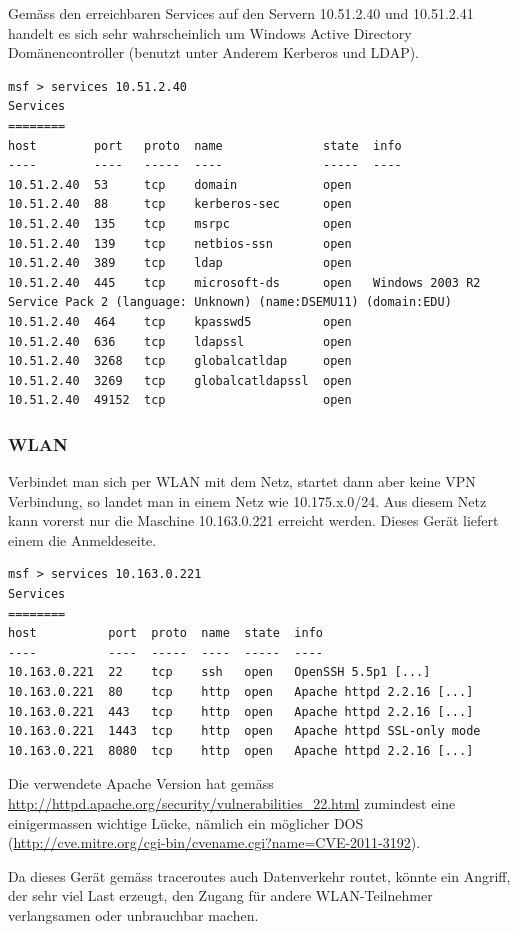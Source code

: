 \documentclass[a4paper,11pt]{scrartcl}
\begin{document}
Gemäss den erreichbaren Services auf den Servern 10.51.2.40 und 10.51.2.41 handelt es sich sehr wahrscheinlich um Windows Active Directory Domänencontroller (benutzt unter Anderem Kerberos und LDAP).
\begin{lstlisting}
msf > services 10.51.2.40
Services
========
host        port   proto  name              state  info
----        ----   -----  ----              -----  ----
10.51.2.40  53     tcp    domain            open   
10.51.2.40  88     tcp    kerberos-sec      open   
10.51.2.40  135    tcp    msrpc             open   
10.51.2.40  139    tcp    netbios-ssn       open   
10.51.2.40  389    tcp    ldap              open   
10.51.2.40  445    tcp    microsoft-ds      open   Windows 2003 R2 Service Pack 2 (language: Unknown) (name:DSEMU11) (domain:EDU)
10.51.2.40  464    tcp    kpasswd5          open   
10.51.2.40  636    tcp    ldapssl           open   
10.51.2.40  3268   tcp    globalcatldap     open   
10.51.2.40  3269   tcp    globalcatldapssl  open   
10.51.2.40  49152  tcp                      open   
\end{lstlisting}

\subsubsection{WLAN}
Verbindet man sich per WLAN mit dem Netz, startet dann aber keine VPN Verbindung, so landet man in einem Netz wie 10.175.x.0/24. Aus diesem Netz kann vorerst nur die Maschine 10.163.0.221 erreicht werden. Dieses Gerät liefert einem die Anmeldeseite.
\begin{lstlisting}
msf > services 10.163.0.221
Services
========
host          port  proto  name  state  info
----          ----  -----  ----  -----  ----
10.163.0.221  22    tcp    ssh   open   OpenSSH 5.5p1 [...]
10.163.0.221  80    tcp    http  open   Apache httpd 2.2.16 [...]
10.163.0.221  443   tcp    http  open   Apache httpd 2.2.16 [...]
10.163.0.221  1443  tcp    http  open   Apache httpd SSL-only mode 
10.163.0.221  8080  tcp    http  open   Apache httpd 2.2.16 [...]
\end{lstlisting}
Die verwendete Apache Version hat gemäss \url{http://httpd.apache.org/security/vulnerabilities_22.html} zumindest eine einigermassen wichtige Lücke, nämlich ein möglicher DOS (\url{http://cve.mitre.org/cgi-bin/cvename.cgi?name=CVE-2011-3192}).

Da dieses Gerät gemäss traceroutes auch Datenverkehr routet, könnte ein Angriff, der sehr viel Last erzeugt, den Zugang für andere WLAN-Teilnehmer verlangsamen oder unbrauchbar machen.
\end{document}
